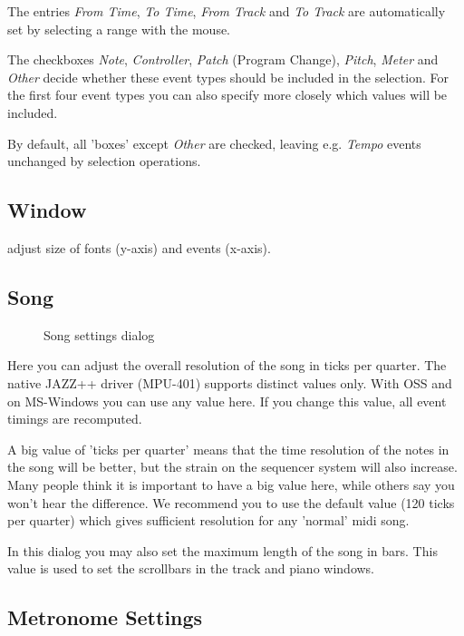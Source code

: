 \documentclass[letterpaper]{report}
\begin{document}
The entries {\em From Time}, {\em To Time}, {\em From Track} and
{\em To Track} are automatically set by selecting a range with the mouse.

The checkboxes {\em Note}, {\em Controller}, {\em Patch} (Program Change),
{\em Pitch}, {\em Meter} and {\em Other} decide whether these event types
should be included in the selection. For the first four event types you can
also specify more closely which values will be included.

By default, all 'boxes' except {\em Other} are checked, leaving e.g.
{\em Tempo} events unchanged by selection operations.

\subsection{Window}
adjust size of fonts (y-axis) and events (x-axis).



\subsection{Song}\label{songset}

\begin{figure}%
%
%
\caption{Song settings dialog}%
\end{figure}

Here you can adjust the overall resolution of the song in ticks per quarter.
The native JAZZ++ driver (MPU-401) supports distinct values only. With OSS
and on MS-Windows you can use any value here. If you change this value,
all event timings are recomputed.

A big value of 'ticks per quarter' means that the time resolution of the
notes in the song will be better, but the strain on the sequencer system
will also increase. Many people think it is important to have a big value here,
while others say you won't hear the difference. We recommend you to use
the default value (120 ticks per quarter) which gives sufficient resolution
for any 'normal' midi song.

In this dialog you may also set the maximum length of the song in bars.
This value is used to set the scrollbars in the track and piano windows.


\subsection{Metronome Settings}\label{metroset}
\end{document}
